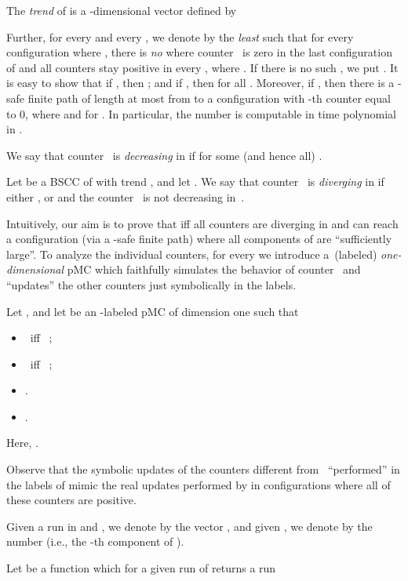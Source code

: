 The \emph{trend} of  is a -dimensional vector   defined by

Further, for every  and every , we denote
by  the \emph{least}  such that 
for every configuration  where ,
there is \emph{no}  where
counter~ is zero in the last configuration of  and all counters
stay positive in every , where .
If there is no such , we put .
It is easy to show that if , then ; and if , then  for all . Moreover, if , then there is a -safe finite path of length at most  from  to a configuration with -th counter equal to 0, where  and  for . In particular, the number  is computable in time polynomial in .

We say that counter~ is
\emph{decreasing} in  if  for some (and
hence all) .

\begin{definition}
  Let  be a BSCC of  with trend , and let 
  . We say that counter~ is \emph{diverging}
  in  if either , or  and the counter~ 
  is not decreasing in~.
\end{definition}
Intuitively, our aim is to prove that  iff
all counters are diverging in  and  can reach a configuration 
 (via a -safe finite path) where all components of 
 are ``sufficiently large''.
To analyze the individual counters, for every 
we introduce a~(labeled) \emph{one-dimensional} pMC
which faithfully simulates the behavior of counter~
and ``updates'' the other counters just symbolically in the labels.

\begin{definition} 
  Let , and let 
  be an -labeled pMC of dimension one such that 
  \begin{itemize}\itemsep1ex
  \item  \ iff \ 
        ;
  \item  \ iff \ 
        ;
  \item .
  \item .
  \end{itemize}
  Here, 
  .
\end{definition}

\noindent
Observe that the symbolic updates of the counters different from~ 
``performed'' in the labels of  mimic the real updates performed
by  in configurations where all of these counters are
positive. 

Given a run  in  and , we denote by  the vector , and given , we denote by  the number  (i.e., the -th component of ).

Let  be a function which for a given run 
 of
 returns a run

